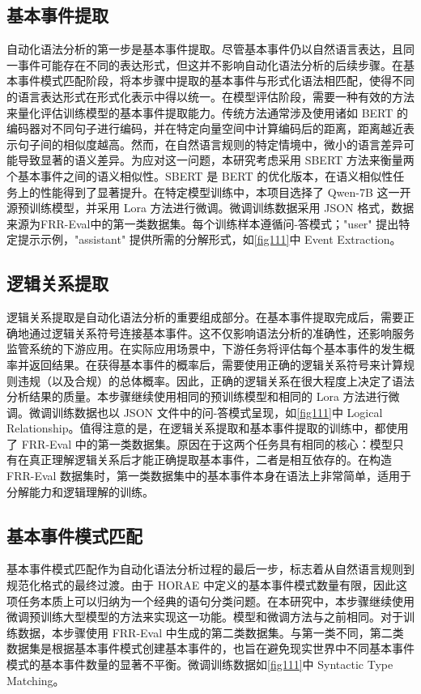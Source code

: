 \subsection{基本事件提取}
自动化语法分析的第一步是基本事件提取。尽管基本事件仍以自然语言表达，且同一事件可能存在不同的表达形式，但这并不影响自动化语法分析的后续步骤。在基本事件模式匹配阶段，将本步骤中提取的基本事件与形式化语法相匹配，使得不同的语言表达形式在形式化表示中得以统一。在模型评估阶段，需要一种有效的方法来量化评估训练模型的基本事件提取能力。传统方法通常涉及使用诸如 BERT 的编码器对不同句子进行编码，并在特定向量空间中计算编码后的距离，距离越近表示句子间的相似度越高。然而，在自然语言规则的特定情境中，微小的语言差异可能导致显著的语义差异。为应对这一问题，本研究考虑采用 SBERT 方法来衡量两个基本事件之间的语义相似性。SBERT 是 BERT 的优化版本，在语义相似性任务上的性能得到了显著提升。在特定模型训练中，本项目选择了 Qwen-7B\cite{bai2023qwen} 这一开源预训练模型，并采用 Lora 方法进行微调。微调训练数据采用 JSON 格式，数据来源为FRR-Eval中的第一类数据集。每个训练样本遵循问-答模式；"user" 提出特定提示示例，"assistant" 提供所需的分解形式，如\autoref{fig111}中 Event Extraction。

\subsection{逻辑关系提取}

逻辑关系提取是自动化语法分析的重要组成部分。在基本事件提取完成后，需要正确地通过逻辑关系符号连接基本事件。这不仅影响语法分析的准确性，还影响服务监管系统的下游应用。在实际应用场景中，下游任务将评估每个基本事件的发生概率并返回结果。在获得基本事件的概率后，需要使用正确的逻辑关系符号来计算规则违规（以及合规）的总体概率。因此，正确的逻辑关系在很大程度上决定了语法分析结果的质量。本步骤继续使用相同的预训练模型和相同的 Lora 方法进行微调。微调训练数据也以 JSON 文件中的问-答模式呈现，如\autoref{fig111}中 Logical Relationship。值得注意的是，在逻辑关系提取和基本事件提取的训练中，都使用了 FRR-Eval 中的第一类数据集。原因在于这两个任务具有相同的核心：模型只有在真正理解逻辑关系后才能正确提取基本事件，二者是相互依存的。在构造 FRR-Eval 数据集时，第一类数据集中的基本事件本身在语法上非常简单，适用于分解能力和逻辑理解的训练。

\subsection{基本事件模式匹配}

基本事件模式匹配作为自动化语法分析过程的最后一步，标志着从自然语言规则到规范化格式的最终过渡。由于 HORAE 中定义的基本事件模式数量有限，因此这项任务本质上可以归纳为一个经典的语句分类问题。在本研究中，本步骤继续使用微调预训练大型模型的方法来实现这一功能。模型和微调方法与之前相同。对于训练数据，本步骤使用 FRR-Eval 中生成的第二类数据集。与第一类不同，第二类数据集是根据基本事件模式创建基本事件的，也旨在避免现实世界中不同基本事件模式的基本事件数量的显著不平衡。微调训练数据如\autoref{fig111}中 Syntactic Type Matching。

